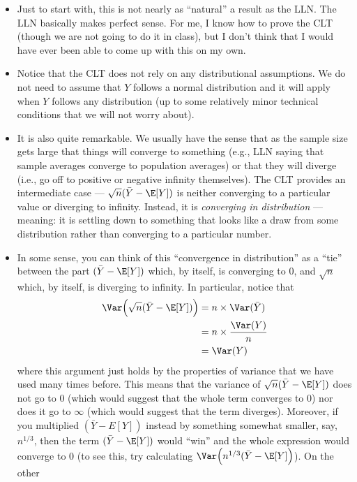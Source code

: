 \documentclass[
  letterpaper,
  DIV=11,
  numbers=noendperiod]{scrreprt}
\begin{document}
\begin{itemize}
\item
  Just to start with, this is not nearly as ``natural'' a result as the
  LLN. The LLN basically makes perfect sense. For me, I know how to
  prove the CLT (though we are not going to do it in class), but I don't
  think that I would have ever been able to come up with this on my own.
\item
  Notice that the CLT does not rely on any distributional assumptions.
  We do not need to assume that \(Y\) follows a normal distribution and
  it will apply when \(Y\) follows any distribution (up to some
  relatively minor technical conditions that we will not worry about).
\item
  It is also quite remarkable. We usually have the sense that as the
  sample size gets large that things will converge to something (e.g.,
  LLN saying that sample averages converge to population averages) or
  that they will diverge (i.e., go off to positive or negative infinity
  themselves). The CLT provides an intermediate case ---
  \(\sqrt{n}(\bar{Y} - \E[Y])\) is neither converging to a particular
  value or diverging to infinity. Instead, it is \emph{converging in
  distribution} --- meaning: it is settling down to something that looks
  like a draw from some distribution rather than converging to a
  particular number.
\item
  In some sense, you can think of this ``convergence in distribution''
  as a ``tie'' between the part \((\bar{Y}-\E[Y])\) which, by itself, is
  converging to 0, and \(\sqrt{n}\) which, by itself, is diverging to
  infinity. In particular, notice that \begin{align*}
  \Var\Big( \sqrt{n} (\bar{Y} - \E[Y]) \Big) &= n \times \Var(\bar{Y}) \\
  &= n \times \frac{\Var(Y)}{n} \\
  &= \Var(Y)
  \end{align*} where this argument just holds by the properties of
  variance that we have used many times before. This means that the
  variance of \(\sqrt{n}(\bar{Y}-\E[Y])\) does not go to 0 (which would
  suggest that the whole term converges to 0) nor does it go to
  \(\infty\) (which would suggest that the term diverges). Moreover, if
  you multiplied \((\bar{Y}-E[Y])\) instead by something somewhat
  smaller, say, \(n^{1/3}\), then the term \((\bar{Y}-\E[Y])\) would
  ``win'' and the whole expression would converge to 0 (to see this, try
  calculating \(\Var\Big(n^{1/3}(\bar{Y} - \E[Y]\Big)\)). On the other

\end{itemize}
\end{document}
